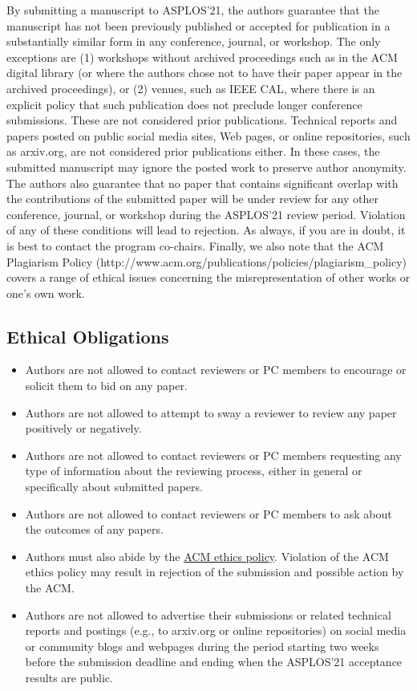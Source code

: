 \documentclass[pageno]{jpaper}
\begin{document}
By submitting a manuscript to ASPLOS'21, the authors guarantee that the
manuscript has not been previously published or accepted for publication in
a substantially similar form in any conference, journal, or workshop. The
only exceptions are (1) workshops without archived proceedings such as in
the ACM digital library (or where the authors chose not to have their paper
appear in the archived proceedings), or (2) venues, such as IEEE CAL, where
there is an explicit policy that such publication does not preclude longer
conference submissions. These are not considered prior publications. 
Technical reports and papers posted on public social media sites, Web pages,
or online repositories, such as arxiv.org, are not considered prior
publications either. In these cases, the submitted manuscript may
ignore the posted work to preserve author anonymity. 
The authors also guarantee that no paper that contains
significant overlap with the contributions of the submitted paper will be
under review for any other conference, journal, or workshop during the
ASPLOS'21 review period. Violation of any of these conditions will lead to
rejection.  As always, if you are in doubt, it is best to contact the
program co-chairs.  Finally, we also note that the ACM Plagiarism Policy
(http://www.acm.org/publications/policies/plagiarism\_policy) covers a range
of ethical issues concerning the misrepresentation of other works or one's
own work.

\subsection{Ethical Obligations}
\begin{itemize}
\item Authors are not allowed to contact reviewers or PC members to encourage or solicit them to bid on any paper.
\item Authors are not allowed to attempt to sway a reviewer to review any paper positively or negatively.
\item Authors are not allowed to contact reviewers or PC members requesting any type of information about the reviewing process, either in general or specifically about submitted papers.
\item Authors are not allowed to contact reviewers or PC members to ask about the outcomes of any papers.
\item Authors must also abide by the
  \href{https://www.acm.org/code-of-ethics}{ACM ethics
    policy}. Violation of the ACM ethics policy may result in
  rejection of the submission and possible action by the ACM.
 \item Authors are not allowed to advertise their submissions or related technical reports and postings (e.g., to arxiv.org or online repositories) on social media or community blogs and webpages during the period starting two weeks before the submission deadline and ending when the ASPLOS’21 acceptance results are public.
\end{itemize}
\end{document}
